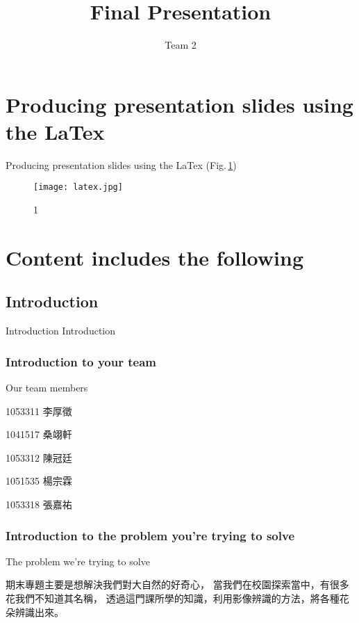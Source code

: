 \documentclass{beamer}
\title{Final Presentation}
\subtitle{Team 2}
\begin{document}
\begin{frame}
  \titlepage
\end{frame}

 \tableofcontents

\section{Producing presentation slides using the LaTex \medskip}
\begin{frame}{Producing presentation slides using the LaTex}
	(Fig.\,\ref{fig:1})
    \begin{figure}
  \texttt{[image: latex.jpg]}
    \caption{1}
    \label{fig:1}
  \end{figure}
\end{frame}


\section{Content includes the following }

\subsection{Introduction}

\begin{frame}{Introduction}
\center \huge Introduction
\end{frame} 


\subsubsection{Introduction to your team}
\begin{frame}{Our team members}
\begin{itemize}
\begin{CJK}{UTF8}{bkai}
  \item   1053311 李厚徵
  \item   1041517 桑翊軒
  \item   1053312 陳冠廷
  \item   1051535 楊宗霖
  \item   1053318 張嘉祐
\end{CJK}
\end{itemize}
\end{frame}

\subsubsection{Introduction to the problem you're trying to solve \medskip}
\begin{frame}{The problem we're trying to solve}
  \begin{CJK}{UTF8}{bkai}
      \begin{spacing}{1.5}\qquad
	期末專題主要是想解決我們對大自然的好奇心，
	當我們在校園探索當中，有很多花我們不知道其名稱，
	透過這門課所學的知識，利用影像辨識的方法，將各種花朵辨識出來。
	\end{spacing}
  \end{CJK}
\end{frame}
\end{document}
